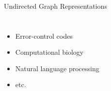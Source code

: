 \begin{frame}{Undirected Graph Representations}
\begin{itemize}
\begin{columns}
        \begin{itemize}[label=$\bullet$]
        \item Error-control codes
        \item Computational biology
        \item Natural language processing
        \item etc.
        \end{itemize}
      \end{columns}
  \end{itemize}


\end{frame}


